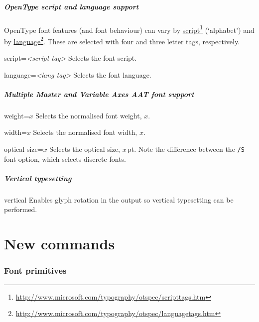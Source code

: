 \documentclass[12pt]{article}
\newenvironment{optdesc}
  {\begin{description}[font=\ttfamily,style=nextline,leftmargin=1.5cm]}
  {\end{description}}
\newcommand\hlink[2]{\href{#1}{#2}\footnote{\url{#1}}}
\begin{document}
\subsubsection{OpenType script and language support}

OpenType font features (and font behaviour) can vary by
\hlink{http://www.microsoft.com/typography/otspec/scripttags.htm}{script}
(‘alphabet’) and by
\hlink{http://www.microsoft.com/typography/otspec/languagetags.htm}{language}.
These are selected with four and three letter tags, respectively.

\begin{optdesc}
\item[script=\textsl{<script tag>}] Selects the font script.
\item[language=\textsl{<lang tag>}] Selects the font language.
\end{optdesc}

\subsubsection{Multiple Master and Variable Axes AAT font support}

\begin{optdesc}
\item[weight=$x$] Selects the normalised font weight, $x$.
\item[width=$x$] Selects the normalised font width, $x$.
\item[optical size=$x$] Selects the optical size, $x$\,pt. Note the
difference between the \texttt{/S} font option, which selects discrete
fonts.
\end{optdesc}

\subsubsection{Vertical typesetting}
\begin{optdesc}
\item[vertical] 
Enables glyph rotation in the output so vertical typesetting can be performed.
\end{optdesc}

\part{New commands}

\section{Font primitives}
\end{document}
